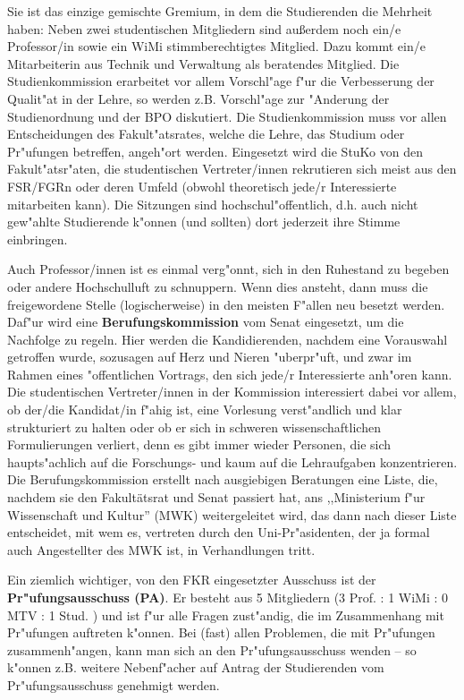 Sie ist das einzige gemischte Gremium, in dem die Studierenden die Mehrheit 
haben: Neben zwei studentischen Mitgliedern sind außerdem noch ein/e Professor/in sowie ein WiMi stimmberechtigtes Mitglied. 
Dazu kommt ein/e Mitarbeiterin aus Technik und Verwaltung als beratendes Mitglied.
Die Studienkommission erarbeitet vor allem Vorschl"age f"ur die Verbesserung der 
Qualit"at in der Lehre, so werden z.B. Vorschl"age zur "Anderung der 
Studienordnung und der BPO diskutiert. Die Studienkommission muss vor allen 
Entscheidungen des Fakult"atsrates, welche die Lehre, das Studium oder 
Pr"ufungen betreffen, angeh"ort werden. Eingesetzt wird die StuKo von den 
Fakult"atsr"aten, die studentischen Vertreter/innen rekrutieren sich meist aus den 
FSR/FGRn oder deren Umfeld (obwohl theoretisch jede/r Interessierte mitarbeiten 
kann). Die Sitzungen sind hochschul"offentlich, d.h. auch nicht gew"ahlte 
Studierende k"onnen (und sollten) dort jederzeit ihre Stimme einbringen.

Auch Professor/innen ist es einmal verg"onnt, sich in den Ruhestand zu begeben oder 
andere Hochschulluft zu schnuppern. Wenn dies ansteht, dann muss die 
freigewordene Stelle (logischerweise) in den meisten F"allen neu besetzt 
werden. Daf"ur wird eine \textbf{Berufungskommission} vom Senat eingesetzt, um 
die Nachfolge zu regeln. Hier werden die Kandidierenden, nachdem eine Vorauswahl 
getroffen wurde, sozusagen auf Herz und Nieren "uberpr"uft, und zwar im Rahmen 
eines "offentlichen Vortrags, den sich jede/r Interessierte anh"oren kann. Die 
 studentischen Vertreter/innen in der Kommission interessiert dabei vor allem, ob 
der/die Kandidat/in f"ahig ist, eine Vorlesung verst"andlich und klar 
strukturiert zu halten oder ob er sich in schweren wissenschaftlichen 
Formulierungen verliert, denn es gibt immer wieder Personen, die sich
haupts"achlich auf die Forschungs- und kaum auf die Lehraufgaben konzentrieren.
Die Berufungskommission 
erstellt nach ausgiebigen Beratungen eine Liste, die, nachdem sie den Fakultätsrat und Senat 
passiert hat, ans ,,Ministerium f"ur 
Wissenschaft und Kultur'' (MWK) weitergeleitet wird, das dann nach dieser 
Liste entscheidet, mit wem es, vertreten durch den Uni-Pr"asidenten, der ja 
formal auch Angestellter des MWK ist, in Verhandlungen tritt.

Ein ziemlich wichtiger, von den FKR eingesetzter Ausschuss ist der 
\textbf{Pr"ufungsausschuss (PA)}. Er besteht aus 5 Mitgliedern (3 Prof. : 1 WiMi : 0 MTV : 
1 Stud. ) und ist f"ur alle Fragen zust"andig, die im Zusammenhang mit Pr"ufungen
auftreten k"onnen. Bei (fast) allen Problemen, die mit Pr"ufungen 
zusammenh"angen, kann
man sich an den Pr"ufungsausschuss wenden -- so k"onnen z.B. weitere
Nebenf"acher auf Antrag der Studierenden vom Pr"ufungsausschuss genehmigt
werden.

